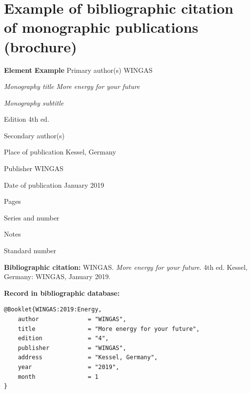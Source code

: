 
\newpage
\section*{Example of bibliographic citation of monographic publications (brochure)}
\label{pr-monografie3}
\begin{tabbing}
\zarazky
\textbf{Element} \> \textbf{Example} \odradkovani
Primary author(s) \>
{\sc WINGAS}

\odradkovani
{\em Monography title} \>
{\em More energy for your future}

\odradkovani
{\em Monography subtitle}\footnotemark[1]

\odradkovani
Edition \>
4th ed.

\odradkovani
Secondary author(s)\footnotemark[1] \>

\odradkovani
Place of publication \>
Kessel, Germany

\odradkovani
Publisher \>
WINGAS

\odradkovani
Date of publication \>
January 2019

\odradkovani
Pages\footnotemark[1] \>

\odradkovani
Series and number \>

\odradkovani
Notes\footnotemark[2] \>

\odradkovani
Standard number \>

\odradkovani
\end{tabbing}

\noindent \textbf{Bibliographic citation:} \odradkovani
{\sc WINGAS}. {\em More energy for your future}. 4th ed. Kessel, Germany: WINGAS, January 2019.

\bigskip \bigskip
\noindent \textbf{Record in bibliographic database:}
\vspace{-0.5em}
\begin{verbatim}
@Booklet{WINGAS:2019:Energy,
    author              = "WINGAS",
    title               = "More energy for your future",
    edition             = "4",
    publisher           = "WINGAS",
    address             = "Kessel, Germany",
    year                = "2019",
    month               = 1
}
\end{verbatim}


